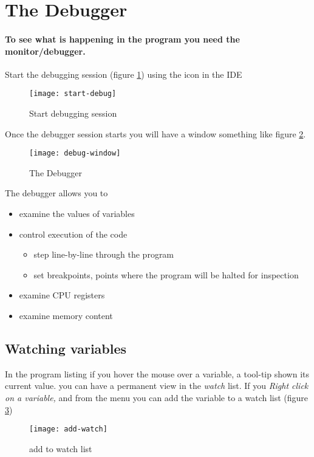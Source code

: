 \documentclass[a4paper]{tufte-handout}
\begin{document}
\clearpage
\section{The Debugger}
\paragraph{To see what is happening in the program you need the
  monitor/debugger.}  Start the debugging session (figure
\ref{fig:debug}) using the icon in the IDE
\begin{figure}
  \flushright
  \texttt{[image: start-debug]}
  \caption{Start debugging session}
  \label{fig:debug}
\end{figure}
Once the debugger session starts you will have a window something like
figure \ref{fig:the-debugger}.
\begin{figure}
  \texttt{[image: debug-window]}
  \caption{The Debugger}
  \label{fig:the-debugger}
\end{figure}
The debugger allows you to 
\begin{itemize}
\item examine the values of variables
\item control execution of the code
  \begin{itemize}
  \item step line-by-line through the program
  \item set breakpoints, points where the program will be halted for
    inspection
  \end{itemize}
\item examine CPU registers
\item examine memory content
\end{itemize}

\subsection{Watching variables}
In the program listing if you hover the mouse over a
variable, a tool-tip shown its current value.
 you can have a
permanent view in the \emph{watch} list.
If you \emph{Right click on a variable,} and from the menu you can add
the variable to a watch list (figure \ref{fig:add-watch})
\begin{figure}
  \flushright
  \texttt{[image: add-watch]}
  \caption{add to watch list}
  \label{fig:add-watch}
\end{figure}
\end{document}
